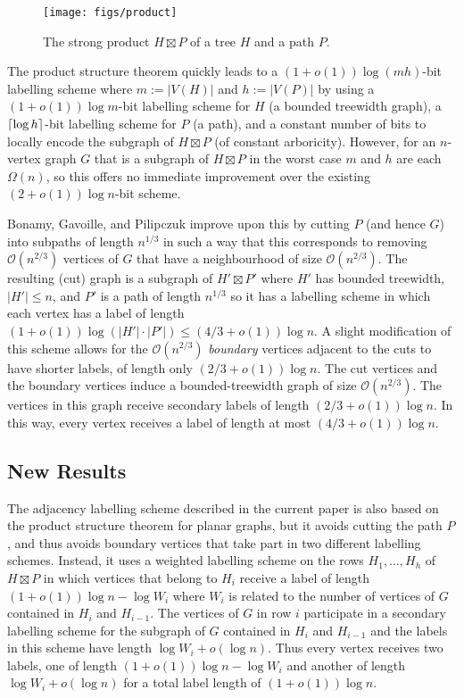 \documentclass[10pt, conference, compsocconf]{IEEEtran}
\newcommand{\Oh}{\mathcal{O}}
\let\le\leqslant
\begin{document}
\begin{figure*}[htbp]
  \begin{center}
    \texttt{[image: figs/product]}
  \end{center}
  \caption{The strong product $H\boxtimes P$ of a tree $H$ and a path $P$.}
\end{figure*}

The product structure theorem quickly leads to a $(1+o(1))\log(mh)$-bit labelling scheme where $m:=|V(H)|$ and $h:=|V(P)|$ by using a $(1+o(1))\log m$-bit labelling scheme for $H$ (a bounded treewidth graph), a ${\lceil \log{h} \rceil}$-bit labelling scheme for $P$ (a path), and a constant number of bits to locally encode the subgraph of $H\boxtimes P$ (of constant arboricity).  However, for an $n$-vertex graph $G$ that is a subgraph of $H\boxtimes P$ in the worst case $m$ and $h$ are each $\Omega(n)$, so this offers no immediate improvement over the existing $(2+o(1))\log n$-bit scheme.

Bonamy, Gavoille, and Pilipczuk improve upon this by cutting $P$ (and hence $G$) into subpaths of length $n^{1/3}$ in such a way that this corresponds to removing $\Oh(n^{2/3})$ vertices of $G$ that have a neighbourhood of size $\Oh(n^{2/3})$. The resulting (cut) graph is a subgraph of $H'\boxtimes P'$ where $H'$ has bounded treewidth, $|H'|\le n$, and $P'$ is a path of length $n^{1/3}$ so it has a labelling scheme in which each vertex has a label of length $(1+o(1))\log (|H'|\cdot|P'|) \le (4/3+o(1))\log n$.  A slight modification of this scheme allows for the $\Oh(n^{2/3})$ \emph{boundary} vertices adjacent to the cuts to have shorter labels, of length only $(2/3+o(1))\log n$.  The cut vertices and the boundary vertices induce a bounded-treewidth graph of size $\Oh(n^{2/3})$.  The vertices in this graph receive secondary labels of length $(2/3+o(1))\log n$.  In this way, every vertex receives a label of length at most $(4/3 + o(1))\log n$.

\subsection{New Results}

The adjacency labelling scheme described in the current paper is also based on the product structure theorem for planar graphs, but it avoids cutting the path $P$, and thus avoids boundary vertices that take part in two different labelling schemes.  Instead, it uses a weighted labelling scheme on the rows $H_1,\dots,H_h$ of $H\boxtimes P$ in which vertices that belong to $H_i$ receive a label of length $(1+o(1))\log n-\log W_i$ where $W_i$ is related to the number of vertices of $G$ contained in $H_i$ and $H_{i-1}$.  The vertices of $G$ in row $i$ participate in a secondary labelling scheme for the subgraph of $G$ contained in $H_i$ and $H_{i-1}$ and the labels in this scheme have length $\log W_i + o(\log n)$. Thus every vertex receives two labels, one of length $(1+o(1))\log n-\log W_i$ and another of length $\log W_i + o(\log n)$ for a total label length of $(1+o(1))\log n$.
\end{document}
